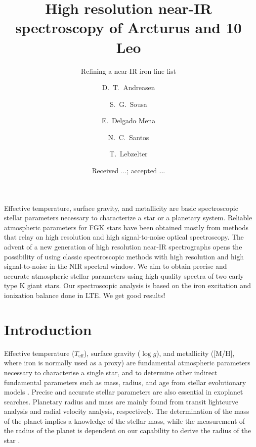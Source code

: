 \documentclass{aa}
\begin{document}
\title{High resolution near-IR spectroscopy of Arcturus and 10 Leo}
\subtitle{Refining a near-IR iron line list}


\author{ D.~T.~Andreasen
    \and S.~G.~Sousa
    \and E.~Delgado Mena
    \and N.~C.~Santos
    \and T.~Lebzelter}







\date{Received ...; accepted ...}

\abstract
{Effective temperature, surface gravity, and metallicity are basic
spectroscopic stellar parameters necessary to characterize
a star or a planetary system. Reliable atmospheric parameters for
FGK stars have been obtained mostly from methods that relay on high
resolution and high signal-to-noise optical spectroscopy. The
advent of a new generation of high resolution near-IR spectrographs
opens the possibility of using classic spectroscopic methods with
high resolution and high signal-to-noise in the NIR spectral window.}
{We aim to obtain precise and accurate atmospheric stellar parameters using
high quality spectra of two early type K giant stars.}
{Our spectroscopic analysis is based on the iron excitation and ionization
balance done in LTE.}
{We get good results!}
{}



\maketitle



\section{Introduction}
\label{sec:introduction}

Effective temperature ($T_\mathrm{eff}$), surface gravity ($\log g$),
and metallicity ([M/H], where iron is normally used as a proxy)
are fundamental atmospheric parameters necessary to characterise a single
star, and to determine other indirect fundamental parameters
such as mass, radius, and age from stellar evolutionary models
\citep[see e.g.][]{Girardi2000,Dotter2008,Baraffe2015}.
Precise and accurate stellar parameters are also essential in
exoplanet searches. Planetary radius and mass are mainly found from
transit lightcurve analysis and radial velocity analysis, respectively. The
determination of the mass of the planet implies a knowledge of the
stellar mass, while the measurement of the radius of the planet
is dependent on our capability to derive the radius of the star
\citep[see e.g.][]{Torres2008,Ammler2009,Torres2012}.
\end{document}
